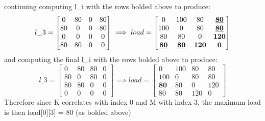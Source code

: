 \documentclass[12pt]{article}
\begin{document}
continuing computing l\_i with the rows bolded above to produce:
\[  l\_3 =
\begin{bmatrix}
    0   & 80   & 0   & 80   \\
    80   & 0   & 0   & 80   \\
    0   & 0   & 0   & 0   \\
    80   & 80   & 0   & 0
\end{bmatrix}
\implies load =
\begin{bmatrix}
    0   & 100 & 80  & \textbf{\underline{80}}   \\
    100 & 0   & 80  & \textbf{\underline{80}}   \\
    80  & 80  & 0   & \textbf{120} \\
    \textbf{\underline{80}}  & \textbf{\underline{80}}  & \textbf{120} & \textbf{0}
\end{bmatrix}
\]
and computing the final l\_i with the rows bolded above to produce:
\[  l\_3 =
\begin{bmatrix}
    0   & 80   & 80   & 0   \\
    80   & 0   & 80   & 0   \\
    80   & 80   & 0   & 0   \\
    0   & 0   & 0   & 0
\end{bmatrix}
\implies load =
\begin{bmatrix}
    0   & 100 & 80  & 80   \\
    100 & 0   & 80  & 80   \\
    \textbf{80}  & 80  & 0   & 120 \\
    80  & 80  & 120 & 0
\end{bmatrix}
\]
Therefore since K correlates with index 0 and M with index 3, the maximum load is
then load[0][3] = 80 (as bolded above)




\end{document}
